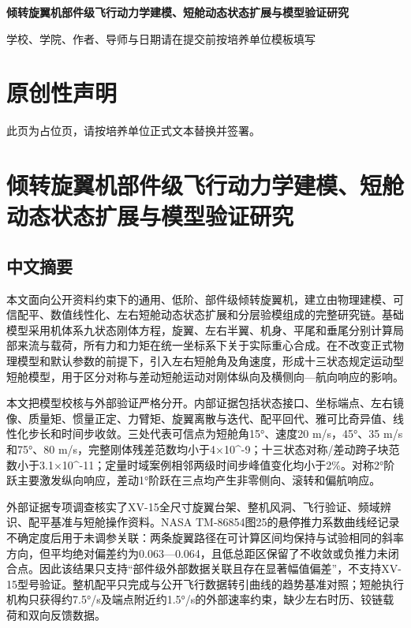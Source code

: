 \documentclass[UTF8,12pt,openany]{ctexbook}
\begin{document}
\begin{titlepage}\centering
{\bfseries 倾转旋翼机部件级飞行动力学建模、短舱动态状态扩展与模型验证研究\par}
\vfill{ 学校、学院、作者、导师与日期请在提交前按培养单位模板填写\par}
\end{titlepage}
\chapter*{原创性声明}
此页为占位页，请按培养单位正式文本替换并签署。
\frontmatter
\tableofcontents
\listoffigures
\listoftables
\mainmatter
\chapter{倾转旋翼机部件级飞行动力学建模、短舱动态状态扩展与模型验证研究}

\section{中文摘要}

本文面向公开资料约束下的通用、低阶、部件级倾转旋翼机，建立由物理建模、可信配平、数值线性化、左右短舱动态状态扩展和分层验模组成的完整研究链。基础模型采用机体系九状态刚体方程，旋翼、左右半翼、机身、平尾和垂尾分别计算局部来流与载荷，所有力和力矩在统一坐标系下关于实际重心合成。在不改变正式物理模型和默认参数的前提下，引入左右短舱角及角速度，形成十三状态规定运动型短舱模型，用于区分对称与差动短舱运动对刚体纵向及横侧向—航向响应的影响。

本文把模型校核与外部验证严格分开。内部证据包括状态接口、坐标端点、左右镜像、质量矩、惯量正定、力臂矩、旋翼离散与迭代、配平回代、雅可比奇异值、线性化步长和时间步收敛。三处代表可信点为短舱角15°、速度20 m/s，45°、35 m/s和75°、80 m/s，完整刚体残差范数均小于4×10^-9；十三状态对称/差动跨子块范数小于3.1×10^-11；定量时域案例相邻两级时间步峰值变化均小于2\%。对称2°阶跃主要激发纵向响应，差动1°阶跃在三点均产生非零侧向、滚转和偏航响应。

外部证据专项调查核实了XV-15全尺寸旋翼台架、整机风洞、飞行验证、频域辨识、配平基准与短舱操作资料。NASA TM-86854图25的悬停推力系数曲线经记录不确定度后用于未调参关联：两条旋翼路径在可计算区间均保持与试验相同的斜率方向，但平均绝对偏差约为0.063—0.064，且低总距区保留了不收敛或负推力未闭合点。因此该结果只支持“部件级外部数据关联且存在显著幅值偏差”，不支持XV-15型号验证。整机配平只完成与公开飞行数据转引曲线的趋势基准对照；短舱执行机构只获得约7.5°/s及端点附近约1.5°/s的外部速率约束，缺少左右时历、铰链载荷和双向反馈数据。
\end{document}

